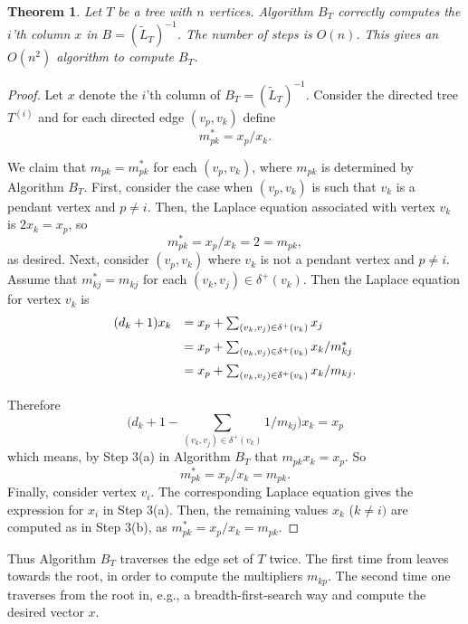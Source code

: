\documentclass[12pt]{article}
\newtheorem{theorem}{Theorem}[section]
\begin{document}
\medskip
\begin{theorem}
 \label{thm:tree_alg_BT}
  Let $T$ be a tree with $n$ vertices. Algorithm $B_T$ correctly computes the $i$'th column $x$ in $B=(\tilde{L}_T)^{-1}$.  The number of steps is $O(n)$. This gives an $O(n^2)$ algorithm to compute $B_T$.
  
\end{theorem}
%
\begin{proof}
Let $x$ denote the $i$'th column of $B_T=(\tilde{L}_T)^{-1}$. Consider the directed tree $T^{(i)}$ and for each directed edge $(v_p,v_k)$ define 
 \[
    m^*_{pk}=x_p/x_k.
 \]
 
 We claim that $m_{pk}=m^*_{pk}$ for each $(v_p,v_k)$, where $m_{pk}$ is determined by Algorithm $B_T$. First, consider the case when $(v_p,v_k)$ is such that $v_k$ is a pendant vertex and $p\not =i$. Then, the Laplace equation associated with vertex $v_k$ is 
 $2x_k=x_p$, so 
 \[
    m^*_{pk}=x_p/x_k=2=m_{pk},
 \]
 as desired. Next, consider $(v_p,v_k)$ where $v_k$ is not a pendant vertex and $p \not =i$. Assume that $m^*_{kj}=m_{kj}$ for each $(v_k,v_j) \in \delta^+(v_k)$. Then the Laplace equation for vertex $v_k$ is 
 \[
 \begin{array}{ll}\vspace{0.2cm}
    (d_k+1)x_k&=x_p+\sum_{(v_k,v_j) \in \delta^+(v_k)} x_j\\ \vspace{0.2cm}
     &=x_p+\sum_{(v_k,v_j) \in \delta^+(v_k)} x_k/m^*_{kj} \\ \vspace{0.2cm}
     &=x_p+\sum_{(v_k,v_j) \in \delta^+(v_k)} x_k/m_{kj}.
 \end{array}
 \]
 Therefore
 \[
  \big(d_k+1-\sum_{(v_k,v_j) \in \delta^+(v_k)} 1/m_{kj}\big)x_k=x_p 
 \]
 which means, by Step 3(a) in Algorithm $B_T$ that
 $m_{pk}x_k=x_p$. So 
 \[
    m^*_{pk}=x_p/x_k=m_{pk}.
 \]
 Finally, consider vertex $v_i$. The corresponding Laplace equation gives the expression for $x_i$ in Step 3(a). Then, the remaining values $x_k$ ($k \not = i)$ are computed as in Step 3(b), as $m^*_{pk}=x_p/x_k=m_{pk}$. 

 

\end{proof}
 
Thus Algorithm $B_T$ traverses the edge set of $T$ twice. The first time from leaves towards the root, in order to compute the multipliers $m_{kp}$. The second time one traverses from the root in, e.g.,  a breadth-first-search way and compute the desired vector $x$.
\end{document}
